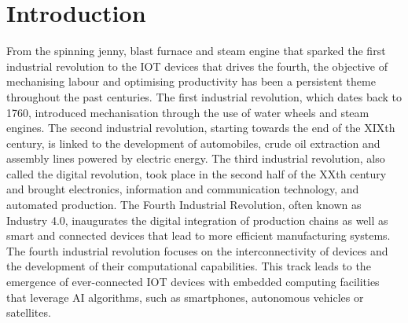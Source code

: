 \chapter{Introduction}\label{chap:intro}




From the spinning jenny, blast furnace and steam engine that sparked the first
industrial revolution to the \ac{IOT} devices that drives the fourth, the
objective of mechanising labour and optimising productivity has been a
persistent theme throughout the past centuries. The first industrial revolution,
which dates back to 1760, introduced mechanisation through the use of water
wheels and steam engines. The second industrial revolution, starting towards the
end of the \textsc{XIX}th century, is linked to the development of automobiles,
crude oil extraction and assembly lines powered by electric energy. The third
industrial revolution, also called the digital revolution, took place in the
second half of the \textsc{XX}th century and brought electronics, information
and communication technology, and automated production. The Fourth Industrial
Revolution, often known as Industry 4.0, inaugurates the digital integration of
production chains as well as smart and connected devices that lead to more
efficient manufacturing systems. The fourth industrial revolution focuses on the
interconnectivity of devices and the development of their computational
capabilities. This track leads to the emergence of ever-connected \ac{IOT}
devices with embedded computing facilities that leverage \ac{AI} algorithms,
such as smartphones, autonomous vehicles or satellites.\\

